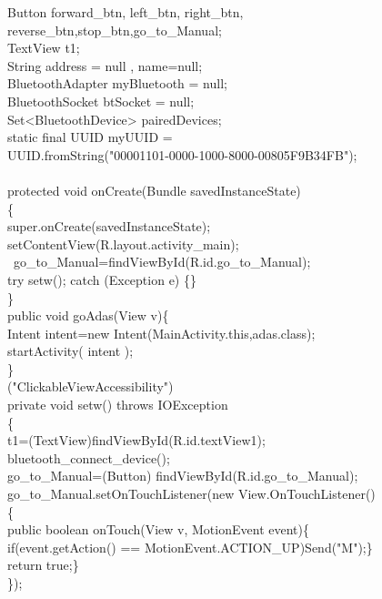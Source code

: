 \documentclass[12pt,a4paper]{report}
\begin{document}
{{    Button forward\_btn, left\_btn, right\_btn,\\  
     reverse\_btn,stop\_btn,go\_to\_Manual;\\
    TextView t1;\\
    String address = null , name=null;\\
    BluetoothAdapter myBluetooth = null;\\
    BluetoothSocket btSocket = null;\\
    Set<BluetoothDevice> pairedDevices;\\
    static final UUID myUUID =\\
     UUID.fromString("00001101-0000-1000-8000-00805F9B34FB");\\
    \@Override\\
    protected void onCreate(Bundle savedInstanceState)\\
    \{\\
        super.onCreate(savedInstanceState);\\
        setContentView(R.layout.activity\_main);\\\
        go\_to\_Manual=findViewById(R.id.go\_to\_Manual);\\
        try {setw();} catch (Exception e) \{\}\\
    \}\\
    public void goAdas(View v)\{\\
        Intent intent=new Intent(MainActivity.this,adas.class);\\
        startActivity( intent );\\
    \}\\
    \@SuppressLint("ClickableViewAccessibility")\\
    private void setw() throws IOException\\
    \{\\
        t1=(TextView)findViewById(R.id.textView1);\\
        bluetooth\_connect\_device();\\
        go\_to\_Manual=(Button) findViewById(R.id.go\_to\_Manual);\\
        go\_to\_Manual.setOnTouchListener(new View.OnTouchListener()\\
        \{ \@Override\\
        public boolean onTouch(View v, MotionEvent event)\{\\
            if(event.getAction() == MotionEvent.ACTION\_UP){Send("M");\}\\
            return true;\}\\
       \});\\

}}}
\end{document}
